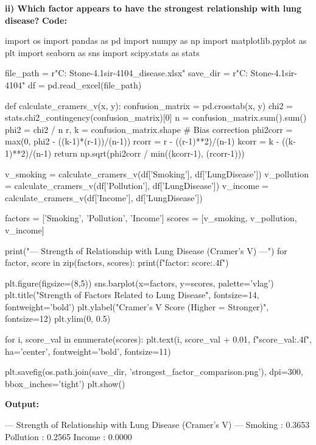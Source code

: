 \documentclass[12pt,a4paper]{article}
\begin{document}
\textbf{ii) Which factor appears to have the strongest relationship with lung disease?}
\textbf{Code:}
\begin{codebox}
import os
import pandas as pd
import numpy as np
import matplotlib.pyplot as plt
import seaborn as sns
import scipy.stats as stats

file_path = r"C:\Users\hp\OneDrive\Desktop
\Reality Stone-4.1\Siddik sir-4104\lung_disease.xlsx"
save_dir = r"C:\Users\hp\OneDrive\Desktop
\Reality Stone-4.1\Siddik sir-4104"
df = pd.read_excel(file_path)

def calculate_cramers_v(x, y):
    confusion_matrix = pd.crosstab(x, y)
    chi2 = stats.chi2_contingency(confusion_matrix)[0]
    n = confusion_matrix.sum().sum()
    phi2 = chi2 / n
    r, k = confusion_matrix.shape
    # Bias correction
    phi2corr = max(0, phi2 - ((k-1)*(r-1))/(n-1))
    rcorr = r - ((r-1)**2)/(n-1)
    kcorr = k - ((k-1)**2)/(n-1)
    return np.sqrt(phi2corr / min((kcorr-1), 
    (rcorr-1)))

v_smoking = calculate_cramers_v(df['Smoking'],
df['LungDisease'])
v_pollution = calculate_cramers_v(df['Pollution'], 
df['LungDisease'])
v_income = calculate_cramers_v(df['Income'],
df['LungDisease'])

factors = ['Smoking', 'Pollution', 'Income']
scores = [v_smoking, v_pollution, v_income]

print("--- Strength of Relationship with
Lung Disease (Cramer's V) ---")
for factor, score in zip(factors, scores):
    print(f"{factor}: {score:.4f}")

plt.figure(figsize=(8,5))
sns.barplot(x=factors, y=scores, palette='vlag')
plt.title("Strength of Factors Related to Lung Disease", 
fontsize=14, fontweight='bold')
plt.ylabel("Cramer's V Score (Higher = Stronger)",
fontsize=12)
plt.ylim(0, 0.5)

for i, score_val in enumerate(scores):
    plt.text(i, score_val + 0.01, f"{score_val:.4f}",
    ha='center', fontweight='bold', fontsize=11)

plt.savefig(os.path.join(save_dir,
'strongest_factor_comparison.png'), dpi=300, bbox_inches='tight')
plt.show()
\end{codebox}

\textbf{Output:}
\begin{codebox}
--- Strength of Relationship with Lung Disease
(Cramer's V) ---
Smoking : 0.3653
Pollution : 0.2565
Income : 0.0000
\end{codebox}
\end{document}
